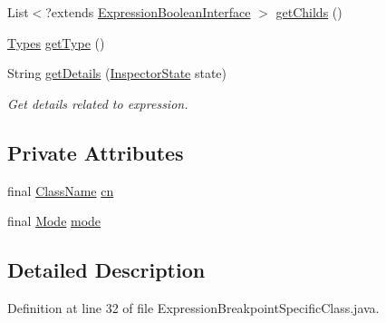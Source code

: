 \begin{DoxyCompactItemize}
\item 
List$<$?extends \hyperlink{interfacegov_1_1nasa_1_1jpf_1_1inspector_1_1server_1_1expression_1_1_expression_boolean_interface}{Expression\+Boolean\+Interface} $>$ \hyperlink{classgov_1_1nasa_1_1jpf_1_1inspector_1_1server_1_1expression_1_1_expression_boolean_leaf_aa99bf3cf13bd8cc1d6c33208bc83b185}{get\+Childs} ()
\item 
\hyperlink{enumgov_1_1nasa_1_1jpf_1_1inspector_1_1server_1_1expression_1_1_types}{Types} \hyperlink{classgov_1_1nasa_1_1jpf_1_1inspector_1_1server_1_1expression_1_1_expression_boolean_aed010ff8683eb1e8621e226703133457}{get\+Type} ()
\item 
String \hyperlink{classgov_1_1nasa_1_1jpf_1_1inspector_1_1server_1_1expression_1_1_expression_boolean_a43423e204404f24bf7862de938598eb7}{get\+Details} (\hyperlink{interfacegov_1_1nasa_1_1jpf_1_1inspector_1_1server_1_1expression_1_1_inspector_state}{Inspector\+State} state)
\begin{DoxyCompactList}\small\item\em Get details related to expression. \end{DoxyCompactList}\end{DoxyCompactItemize}
\subsection*{Private Attributes}
\begin{DoxyCompactItemize}
\item 
final \hyperlink{classgov_1_1nasa_1_1jpf_1_1inspector_1_1utils_1_1expressions_1_1_class_name}{Class\+Name} \hyperlink{classgov_1_1nasa_1_1jpf_1_1inspector_1_1server_1_1expression_1_1expressions_1_1_expression_breakpoint_specific_class_a8b349a2bc853aa6aa784b1115100fb9d}{cn}
\item 
final \hyperlink{enumgov_1_1nasa_1_1jpf_1_1inspector_1_1server_1_1expression_1_1expressions_1_1_expression_breakpoint_specific_class_1_1_mode}{Mode} \hyperlink{classgov_1_1nasa_1_1jpf_1_1inspector_1_1server_1_1expression_1_1expressions_1_1_expression_breakpoint_specific_class_ac70d09d536230778d1ab30771e399824}{mode}
\end{DoxyCompactItemize}


\subsection{Detailed Description}


Definition at line 32 of file Expression\+Breakpoint\+Specific\+Class.\+java.



